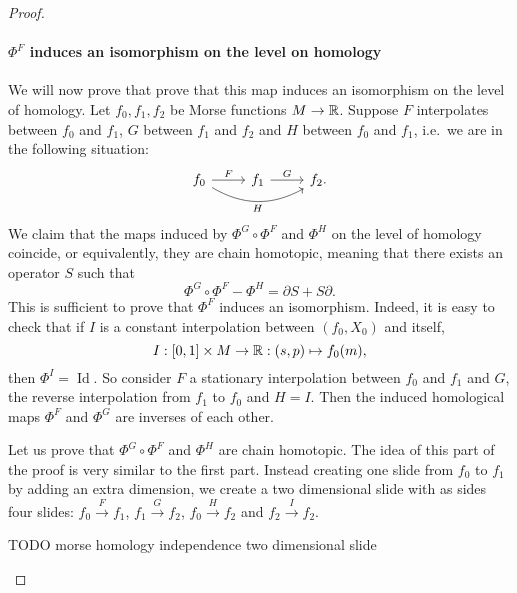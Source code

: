 \begin{proof}
\paragraph{$\Phi^{F}$ induces an isomorphism on the level on homology}

We will now prove that prove that this map induces an isomorphism on the level of homology.
Let $f_0, f_1, f_2$ be Morse functions $M \to  \mathbb{R}$.
Suppose $F$ interpolates between $f_0$ and $f_1$,
$G$ between $f_1$ and $f_2$ and $H$ between $f_0$ and $f_1$, i.e.\ we are in the following situation:
\[
    \begin{tikzcd}
        f_0 \arrow[rr, "H"', bend right] \arrow[r, "F"] &f_1 \arrow[r, "G"] &f_2.
    \end{tikzcd}
\]
We claim that the maps induced by $\Phi^{G} \circ \Phi^{F}$ and $\Phi^{H}$ on the level of homology coincide, or equivalently, they are chain homotopic, meaning that there exists an operator $S$ such that
 \[
\Phi^{G}  \circ  \Phi^{F} - \Phi^{H} = \partial S + S \partial
.\] 
This is sufficient to prove that $\Phi^{F}$ induces an isomorphism.
Indeed, it is easy to check that if $I$ is a constant interpolation between  $(f_0, X_0)$ and itself, 
\[
    I: [0,1] \times M \to  \mathbb{R}: (s, p) \mapsto f_0(m),
\] 
then $\Phi^{I} = \operatorname{Id}$.
So consider $F$ a stationary interpolation between $f_0$ and $f_1$ and $G$, the reverse interpolation from $f_1$ to $f_0$ and $H = I$. Then the induced homological maps $\Phi^{F}$ and $\Phi^{G}$ are inverses of each other.

Let us prove that $\Phi^{G}  \circ  \Phi^{F}$ and $\Phi^{H}$ are chain homotopic.
The idea of this part of the proof is very similar to the first part.
Instead creating one slide from $f_0$ to $f_1$ by adding an extra dimension, we create a two dimensional slide with as sides four slides: $f_0 \xrightarrow{F} f_1$, $ f_1 \xrightarrow{G} f_2$, $f_0 \xrightarrow{H}  f_2$ and $ f_2 \xrightarrow{I} f_2$.

\begin{marginfigure}
    \centering
    \caption{TODO morse homology independence two dimensional slide}
    \label{fig:morse-homology-independence-two-dimensional-slide}
\end{marginfigure}


\end{proof}
